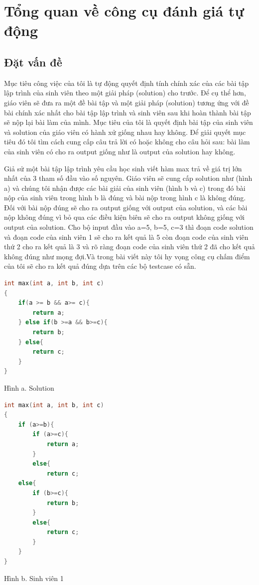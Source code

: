 \documentclass[12pt,a4paper]{article}
\begin{document}
\section{Tổng quan về công cụ đánh giá tự động}

\subsection{Đặt vấn đề}

Mục tiêu công việc của tôi là tự động quyết định tính chính xác của các bài tập lập trình của sinh viên theo một giải pháp (solution) cho trước. Để cụ thể hơn, giáo viên sẽ đưa ra một đề bài tập và một giải pháp (solution) tương ứng với đề bài chính xác nhất cho bài tập lập trình và sinh viên sau khi hoàn thành bài tập sẽ nộp lại bài làm của mình. Mục tiêu của tôi là quyết định bài tập của sinh viên và solution của giáo viên có hành xử giống nhau hay không. Để giải quyết mục tiêu đó tôi tìm cách cung cấp câu trả lời có hoặc không cho câu hỏi sau: bài làm của sinh viên có cho ra output giống như là output của solution hay không.

Giả sử một bài tập lập trình yêu cầu học sinh viết hàm max trả về giá trị lớn nhất của 3 tham số đầu vào số nguyên. Giáo viên sẽ cung cấp solution như (hình a) và chúng tôi nhận được các bài giải của sinh viên (hình b và c) trong đó bài nộp của sinh viên trong hình b là đúng và bài nộp trong hình c là không đúng. Đối với bài nộp đúng sẽ cho ra output giống với output của solution, và các bài nộp không đúng vì bỏ qua các điều kiện biên sẽ cho ra output không giống với output của solution. Cho bộ input đầu vào 
a=5, b=5, c=3 thì đoạn code solution và đoạn code của sinh viên 1 sẽ cho ra kết quả là 5 còn đoạn code của sinh viên thứ 2 cho ra kết quả là 3 và rõ ràng đoạn code của sinh viên thứ 2 đã cho kết quả không đúng như mọng đợi.Và trong bài viết này tôi hy vọng công cụ chấm điểm của tôi sẽ cho ra kết quả đúng dựa trên các bộ testcase có sẵn.

\begin{lstlisting}[language=c]
int max(int a, int b, int c) 
{
    if(a >= b && a>= c){
        return a;
    } else if(b >=a && b>=c){
        return b;
    } else{
        return c;
    }
}
\end{lstlisting}
\caption{Hình a. Solution}

\begin{lstlisting}[language=c]
int max(int a, int b, int c) 
{ 
    if (a>=b){
        if (a>=c){
            return a;
        }
        else{
            return c;
    else{
        if (b>=c){
            return b;
        }
        else{
            return c; 
        }
    }
}
\end{lstlisting}
\caption{Hình b. Sinh viên 1}
\end{document}
